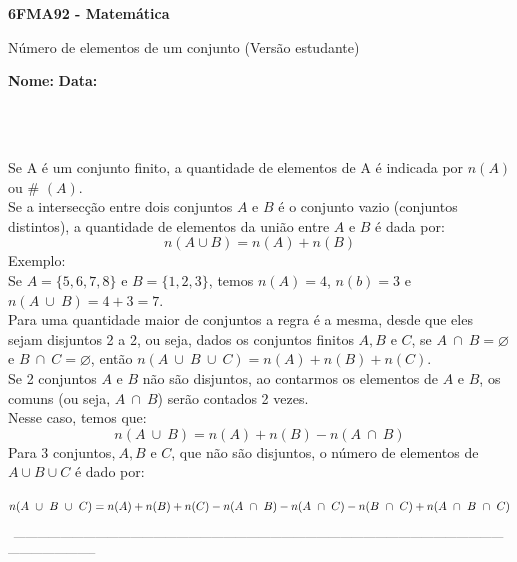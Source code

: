 \documentclass[a4paper,14pt]{article}
\begin{document}
	
	\noindent\textbf{6FMA92 - Matemática} 
	
	\begin{center}Número de elementos de um conjunto (Versão estudante)
	\end{center}
	
	\noindent\textbf{Nome:} \underline{\hspace{10cm}}
	\noindent\textbf{Data:} \underline{\hspace{4cm}}
	
	~ \\ ~
	\begin{multicols}{2}
	\noindent Se A é um conjunto finito, a quantidade de elementos de A é indicada por $n(A)$ ou \# $(A)$. \\
	Se a intersecção entre dois conjuntos $A$ e $B$ é o conjunto vazio (conjuntos distintos), a quantidade de elementos da união entre $A$ e $B$ é dada por:
	\begin{equation*}
		n(A \cup B) = n(A) + n(B)
	\end{equation*}
	Exemplo: \\
	Se $A = \{5, 6, 7, 8\}$ e $B = \{1, 2, 3\}$, temos $n(A) = 4$, $n(b) = 3$ e $n(A~\cup~B) = 4 + 3 = 7$. \\
	Para uma quantidade maior de conjuntos a regra é a mesma, desde que eles sejam disjuntos 2 a 2, ou seja, dados os conjuntos finitos $A, B$ e $C$, se $A~\cap~B = \varnothing$ e $B~\cap~C = \varnothing$, então $n(A~\cup~B~\cup~C) = n(A) + n(B) + n(C)$. \\
	Se 2 conjuntos $A$ e $B$ não são disjuntos, ao contarmos os elementos de $A$ e $B$, os comuns (ou seja, $A~\cap~B$) serão contados 2 vezes. \\
	Nesse caso, temos que:
	\begin{equation*}
		n(A~\cup~B) = n(A) + n(B) - n(A~\cap~B)
	\end{equation*}
	Para 3 conjuntos,$~A, B$ e $C$, que não são disjuntos, o número de elementos de $A \cup B \cup C$ é dado por: \\\\
	$
		n(A~\cup~B~\cup~C) = n(A) + n(B) \\
		+ n(C) - n(A~\cap~B) - n(A~\cap~C) \\ 
		- n(B~\cap~C) 
		+ n(A~\cap~B~\cap~C)
		$
	\end{multicols}
\noindent\textsubscript{~-----------------------------------------------------------------------------------------------------------------------------------------------------}
\end{document}
